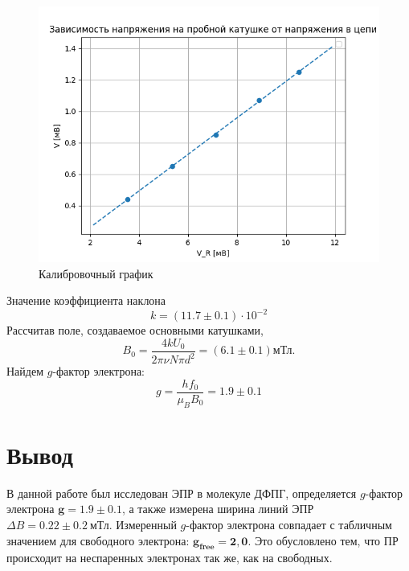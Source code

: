 \documentclass[a4paper,12pt]{article} %
\begin{document}
    \begin{figure}[h!]
      \centering
      \includegraphics[scale=0.65]{img/Gra.png}
      \caption{Калибровочный график}
    \end{figure}
    Значение коэффициента наклона 
    \[ k = (11.7 \pm 0.1) \cdot 10^{-2} \]
    Рассчитав поле, создаваемое основными катушками,
    \begin{equation*}
        B_0 = \frac{4 k U_0}{2\pi\nu N \pi d^2} = (6.1 \pm 0.1) \text{мТл}.
    \end{equation*}
    Найдем $g$-фактор электрона:
    \begin{equation*}
        g = \frac{hf_0}{\mu_BB_0} = 1.9 \pm 0.1
    \end{equation*}

  \section*{Вывод}
    В данной работе был исследован ЭПР в молекуле ДФПГ, определяется $g$-фактор электрона $\pmb{g = 1.9 \pm 0.1}$, а также измерена ширина линий ЭПР $\Delta B = 0.22 \pm 0.2~\text{мТл}$. 
	  Измеренный $g$-фактор электрона совпадает с табличным значением для свободного электрона: $\pmb{g_{free} = 2,0}$. 
    Это обусловлено тем, что ПР происходит на неспаренных электронах так же, как на свободных.
\end{document}
